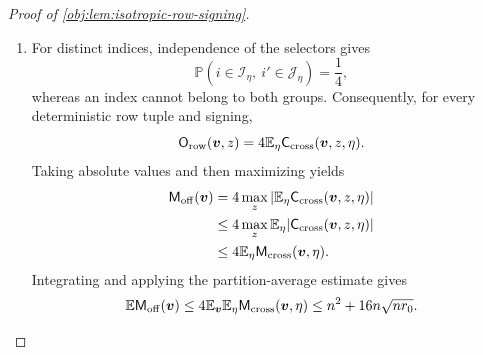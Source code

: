 \documentclass[11pt]{article}
\begin{document}
\begin{proof}[Proof of \cref{obj:lem:isotropic-row-signing}]
\begin{enumerate}
\[\leq\frac{n^2}{4}.
\]
Both group sizes are at most \(n\), so
\[
\begin{aligned}
&4\mathsf N_{\rm sel}(\eta)
\sqrt{\mathsf N_{\rm comp}(\eta)r_0}
+4\mathsf N_{\rm comp}(\eta)
\sqrt{\mathsf N_{\rm sel}(\eta)r_0}\\
&\hspace{2em}\leq
4\bigl(\mathsf N_{\rm sel}(\eta)+\mathsf N_{\rm comp}(\eta)\bigr)
\sqrt{nr_0}
=4n\sqrt{nr_0}.
\end{aligned}
\]
Therefore every selector satisfies
\[
\mathbb E_{\boldsymbol v}\mathsf M_{\rm cross}(\boldsymbol v,\eta)
\leq\frac{n^2}{4}+4n\sqrt{nr_0}.
\]

Averaging this bound over the finite selector space and interchanging the integrable expectations gives
\[
\begin{aligned}
4\mathbb E_{\boldsymbol v}\mathbb E_\eta
\mathsf M_{\rm cross}(\boldsymbol v,\eta)
&=4\mathbb E_\eta\mathbb E_{\boldsymbol v}
\mathsf M_{\rm cross}(\boldsymbol v,\eta)\\
&\leq n^2+16n\sqrt{nr_0}.
\end{aligned}
\]

\item For distinct indices, independence of the selectors gives
\[
\mathbb P(i\in\mathcal I_\eta,\ i'\in\mathcal J_\eta)=\frac14,
\]
whereas an index cannot belong to both groups. Consequently, for every deterministic row tuple and signing,
\[
\mathsf O_{\rm row}(\boldsymbol v,z)
=4\mathbb E_\eta\mathsf C_{\rm cross}(\boldsymbol v,z,\eta).
\]
Taking absolute values and then maximizing yields
\[
\begin{aligned}
\mathsf M_{\rm off}(\boldsymbol v)
&=4\max_z
\left|\mathbb E_\eta\mathsf C_{\rm cross}(\boldsymbol v,z,\eta)\right|\\
&\leq4\max_z
\mathbb E_\eta|\mathsf C_{\rm cross}(\boldsymbol v,z,\eta)|\\
&\leq4\mathbb E_\eta\mathsf M_{\rm cross}(\boldsymbol v,\eta).
\end{aligned}
\]
Integrating and applying the partition-average estimate gives
\[
\mathbb E\mathsf M_{\rm off}(\boldsymbol v)
\leq4\mathbb E_{\boldsymbol v}\mathbb E_\eta
\mathsf M_{\rm cross}(\boldsymbol v,\eta)
\leq n^2+16n\sqrt{nr_0}.
\]


\end{enumerate}
\end{proof}
\end{document}
